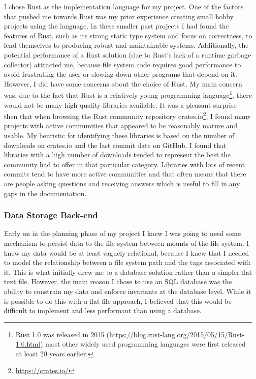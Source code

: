 I chose Rust as the implementation language for my project. One of the factors
that pushed me towards Rust was my prior experience creating small hobby
projects using the language. In these smaller past projects I had found the
features of Rust, such as its strong static type system and focus on
correctness, to lend themselves to producing robust and maintainable systems.
Additionally, the potential performance of a Rust solution (due to Rust's lack
of a runtime garbage collector) attracted me, because file system code requires
good performance to avoid frustrating the user or slowing down other programs
that depend on it. However, I did have some concerns about the choice of Rust.
My main concern was, due to the fact that Rust is a relatively young
programming language\footnote{Rust 1.0 was released in 2015
(\url{https://blog.rust-lang.org/2015/05/15/Rust-1.0.html}) most other widely
used programming languages were first released at least 20 years earlier.},
there would not be many high quality libraries available. It was a pleasant
surprise then that when browsing the Rust community repository
crates.io\footnote{\url{https://crates.io/}}, I found many projects with active
communities that appeared to be reasonably mature and usable. My heuristic for
identifying these libraries is based on the number of downloads on crates.io
and the last commit date on GitHub. I found that libraries with a high number
of downloads tended to represent the best the community had to offer in that
particular category. Libraries with lots of recent commits tend to have more
active communities and that often means that there are people asking questions
and receiving answers which is useful to fill in any gaps in the documentation.


\subsubsection{Data Storage Back-end}

Early on in the planning phase of my project I knew I was going to need some
mechanism to persist data to the file system between mounts of the file system.
I knew my data would be at least vaguely relational, because I knew that I
needed to model the relationship between a file system path and the tags
associated with it. This is what initially drew me to a database solution
rather than a simpler flat text file. However, the main reason I chose to use
an SQL database was the ability to constrain my data and enforce invariants at
the database level. While it is possible to do this with a flat file approach,
I believed that this would be difficult to implement and less performant than
using a database.

